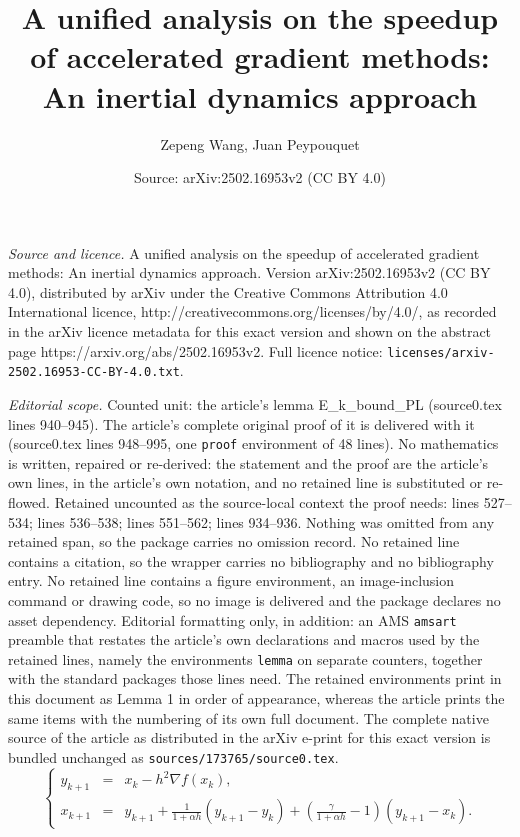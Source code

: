 \documentclass[10pt,a4paper]{amsart}
\title{A unified analysis on the speedup of accelerated gradient methods: An inertial dynamics approach}
\author{Zepeng Wang, Juan Peypouquet}
\date{Source: arXiv:2502.16953v2 (CC BY 4.0)}
\begin{document}
\maketitle

\noindent\emph{Source and licence.} A unified analysis on the speedup of accelerated gradient methods: An inertial dynamics approach. Version arXiv:2502.16953v2 (CC BY 4.0), distributed by arXiv under the Creative Commons Attribution 4.0 International licence, http://creativecommons.org/licenses/by/4.0/, as recorded in the arXiv licence metadata for this exact version and shown on the abstract page https://arxiv.org/abs/2502.16953v2. Full licence notice: \texttt{licenses/arxiv-2502.16953-CC-BY-4.0.txt}.\par\smallskip

\noindent\textit{Editorial scope.} Counted unit: the article's lemma E\_k\_bound\_PL (source0.tex lines 940--945). The article's complete original proof of it is delivered with it (source0.tex lines 948--995, one \texttt{proof} environment of 48 lines). No mathematics is written, repaired or re-derived: the statement and the proof are the article's own lines, in the article's own notation, and no retained line is substituted or re-flowed.  Retained uncounted as the source-local context the proof needs: lines 527--534; lines 536--538; lines 551--562; lines 934--936.  Nothing was omitted from any retained span, so the package carries no omission record.  No retained line contains a citation, so the wrapper carries no bibliography and no bibliography entry.  No retained line contains a figure environment, an image-inclusion command or drawing code, so no image is delivered and the package declares no asset dependency.  Editorial formatting only, in addition: an AMS \texttt{amsart} preamble that restates the article's own declarations and macros used by the retained lines, namely the environments \texttt{lemma} on separate counters, together with the standard packages those lines need.  The retained environments print in this document as Lemma 1 in order of appearance, whereas the article prints the same items with the numbering of its own full document.  The complete native source of the article as distributed in the arXiv e-print for this exact version is bundled unchanged as \texttt{sources/173765/source0.tex}.
\begin{equation}\label{Algo: AGM}\tag{AGM}
\left\{
\begin{array}{rcl}
y_{k+1} & = & x_k - h^2 \nabla f(x_k),\\[2pt]
x_{k+1} & = & y_{k+1} + \frac{1}{1 + \alpha h}( y_{k+1} - y_k ) + \left( \frac{\gamma}{1+\alpha h} - 1 \right) ( y_{k+1} - x_k ).
\end{array}
\right.
\end{equation}
\end{document}
